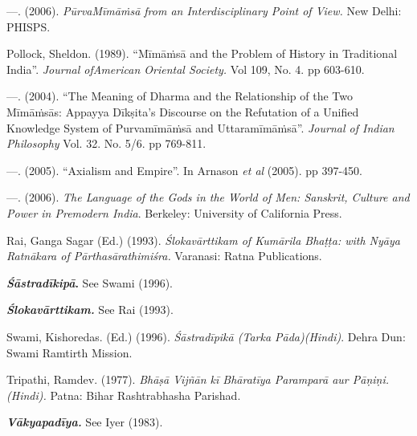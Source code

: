 \begin{thebibliography}{99}
  —. (2006). \textit{PūrvaMīmāṁsā from an Interdisciplinary Point of View.} New Delhi: PHISPS. 

  Pollock, Sheldon. (1989). “Mīmāṁsā and the Problem of History in Traditional India”. \textit{Journal ofAmerican Oriental Society.} Vol 109, No. 4. pp 603-610.

  —. (2004). “The Meaning of Dharma and the Relationship of the Two Mīmāṁsās: Appayya Dīkṣita’s Discourse on the Refutation of a Unified Knowledge System of Purvamīmāṁsā and Uttaramīmāṁsā”. \textit{Journal of Indian Philosophy} Vol. 32. No. 5/6. pp 769-811. 

  —. (2005). “Axialism and Empire”. In Arnason \textit{et al} (2005). pp 397-450.

  —. (2006). \textit{The Language of the Gods in the World of Men: Sanskrit, Culture and Power in Premodern India}. Berkeley: University of California Press.

  Rai, Ganga Sagar (Ed.) (1993). \textit{Ślokavārttikam of Kumārila Bhaṭṭa: with Nyāya Ratnākara of Pārthasārathimiśra.} Varanasi: Ratna Publications.

  \textbf{\textit{Śāstradīkipā}.} See Swami (1996).

  \textbf{\textit{Ślokavārttikam.}} See Rai (1993).

  Swami, Kishoredas. (Ed.) (1996). \textit{Śāstradīpikā (Tarka Pāda)(Hindi)}. Dehra Dun: Swami Ramtirth Mission.

  Tripathi, Ramdev. (1977). \textit{Bhāṣā Vijñān kī Bhāratīya Paramparā aur Pāṇiṇi. (Hindi).} Patna: Bihar Rashtrabhasha Parishad.

  \textbf{\textit{Vākyapadīya.}} See Iyer (1983).
 
 \end{thebibliography}

\label{chapter6-end}
